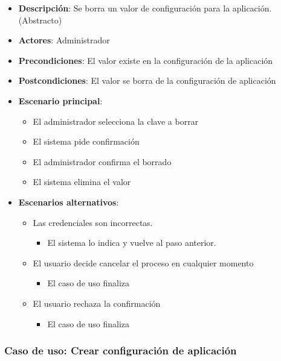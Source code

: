\documentclass[12pt,a4paperpaper,]{report}
\providecommand{\tightlist}{%
  \setlength{\itemsep}{0pt}\setlength{\parskip}{0pt}}
\begin{document}
\begin{itemize}
\tightlist
\item
  \textbf{Descripción}: Se borra un valor de configuración para la
  aplicación. (Abstracto)
\item
  \textbf{Actores}: Administrador
\item
  \textbf{Precondiciones}: El valor existe en la configuración de la
  aplicación
\item
  \textbf{Postcondiciones}: El valor se borra de la configuración de
  aplicación
\item
  \textbf{Escenario principal}:

  \begin{itemize}
  \tightlist
  \item
    El administrador selecciona la clave a borrar
  \item
    El sistema pide confirmación
  \item
    El administrador confirma el borrado
  \item
    El sistema elimina el valor
  \end{itemize}
\item
  \textbf{Escenarios alternativos}:

  \begin{itemize}
  \tightlist
  \item
    Las credenciales son incorrectas.

    \begin{itemize}
    \tightlist
    \item
      El sistema lo indica y vuelve al paso anterior.
    \end{itemize}
  \item
    El usuario decide cancelar el proceso en cualquier momento

    \begin{itemize}
    \tightlist
    \item
      El caso de uso finaliza
    \end{itemize}
  \item
    El usuario rechaza la confirmación

    \begin{itemize}
    \tightlist
    \item
      El caso de uso finaliza
    \end{itemize}
  \end{itemize}
\end{itemize}

\subsubsection{Caso de uso: Crear configuración de
aplicación}\label{caso-de-uso-crear-configuraciuxf3n-de-aplicaciuxf3n}
\end{document}
